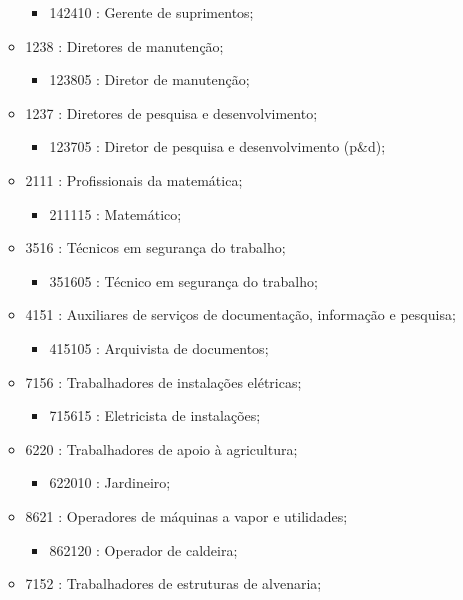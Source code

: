 \begin{itemize}
\begin{itemize}
\begin{itemize}
      \item 142410 : Gerente de suprimentos;
    \end{itemize}
    \item 1238 : Diretores de manutenção;
    \begin{itemize}
      \item 123805 : Diretor de manutenção;
    \end{itemize}
    \item 1237 : Diretores de pesquisa e desenvolvimento;
    \begin{itemize}
      \item 123705 : Diretor de pesquisa e desenvolvimento (p\&d);
    \end{itemize}
    \item 2111 : Profissionais da matemática;
    \begin{itemize}
      \item 211115 : Matemático;
    \end{itemize}
    \item 3516 : Técnicos em segurança do trabalho;
    \begin{itemize}
      \item 351605 : Técnico em segurança do trabalho;
    \end{itemize}
    \item 4151 : Auxiliares de serviços de documentação, informação e pesquisa;
    \begin{itemize}
      \item 415105 : Arquivista de documentos;
    \end{itemize}
    \item 7156 : Trabalhadores de instalações elétricas;
    \begin{itemize}
      \item 715615 : Eletricista de instalações;
    \end{itemize}
    \item 6220 : Trabalhadores de apoio à agricultura;
    \begin{itemize}
      \item 622010 : Jardineiro;
    \end{itemize}
    \item 8621 : Operadores de máquinas a vapor e utilidades;
    \begin{itemize}
      \item 862120 : Operador de caldeira;
    \end{itemize}
    \item 7152 : Trabalhadores de estruturas de alvenaria;

\end{itemize}
\end{itemize}
